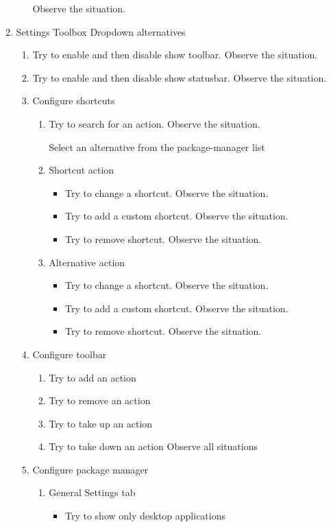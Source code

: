 \documentclass[a4paper,10pt]{article}
\begin{document}
\begin{enumerate}
\begin{enumerate}
\begin{enumerate}
            Observe the situation.
        \end{enumerate}
    
        \item Settings Toolbox
        Dropdown alternatives
        \begin{enumerate}
            \item Try to enable and then disable show toolbar. Observe the situation.
            \item Try to enable and then disable show statusbar. Observe the situation.
            \item Configure shortcuts
            \begin{enumerate}
                \item Try to search for an action. Observe the situation.
    
                Select an alternative from the package-manager list
                \item Shortcut action
                \begin{itemize}
                    \item Try to change a shortcut. Observe the situation.
                    \item Try to add a custom shortcut. Observe the situation.
                    \item Try to remove shortcut. Observe the situation.
                \end{itemize}
    
                \item Alternative action
                \begin{itemize}
                    \item Try to change a shortcut. Observe the situation.
                    \item Try to add a custom shortcut. Observe the situation.
                    \item Try to remove shortcut. Observe the situation.
                \end{itemize}
            \end{enumerate}
            \item Configure toolbar
            \begin{enumerate}
                \item Try to add an action 
                \item Try to remove an action
                \item Try to take up an action
                \item Try to take down an action
                Observe all situations
            \end{enumerate}
            \item Configure package manager
            \begin{enumerate}
                \item General Settings tab
                \begin{itemize}
                    \item Try to show only desktop applications


\end{itemize}
\end{enumerate}
\end{enumerate}
\end{enumerate}
\end{enumerate}
\end{document}
